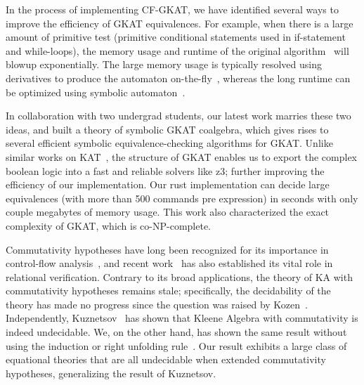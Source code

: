 \documentclass[11pt,a4paper,sans]{moderncv} %
\begin{document}


In the process of implementing CF-GKAT, we have identified several ways to improve the efficiency of GKAT equivalences.
For example, when there is a large amount of primitive test (primitive conditional statements used in if-statement and while-loops), the memory usage and runtime of the original algorithm~\cite{smolka_GuardedKleeneAlgebra_2020} will blowup exponentially. 
The large memory usage is typically resolved using derivatives to produce the automaton on-the-fly~\cite{brzozowski_DerivativesRegularExpressions_1964, schmid_GuardedKleeneAlgebra_2021}, whereas the long runtime can be optimized using symbolic automaton~\cite{pous_SymbolicAlgorithmsLanguage_2015}. 

In collaboration with two undergrad students, our latest work marries these two ideas, and built a theory of symbolic GKAT coalgebra, which gives rises to several efficient symbolic equivalence-checking algorithms for GKAT. 
Unlike similar works on KAT~\cite{pous_SymbolicAlgorithmsLanguage_2015}, the structure of GKAT enables us to export the complex boolean logic into a fast and reliable solvers like z3; further improving the efficiency of our implementation.
Our rust implementation can decide large equivalences (with more than 500 commands pre expression) in seconds with only couple megabytes of memory usage.
This work also characterized the exact complexity of GKAT, which is co-NP-complete.



Commutativity hypotheses have long been recognized for its importance in control-flow analysis~\cite{kozen_KleeneAlgebraTests_1996}, and recent work~\cite{antonopoulos_AlgebraAlignmentRelational_2023} has also established its vital role in relational verification. 
Contrary to its broad applications, the theory of KA with commutativity hypotheses remains stale; specifically, the decidability of the theory has made no progress since the question was raised by Kozen~\cite{kozen_KleeneAlgebraTests_1996}.
Independently, Kuznetsov~\cite{kuznetsov_ComplexityReasoningKleene_2023} has shown that Kleene Algebra with commutativity is indeed undecidable. We, on the other hand, has shown the same result without using the induction or right unfolding rule~\cite{azevedodeamorim_KleeneAlgebraCommutativity_2024}. 
Our result exhibits a large class of equational theories that are all undecidable when extended commutativity hypotheses, generalizing the result of Kuznetsov.
\end{document}
